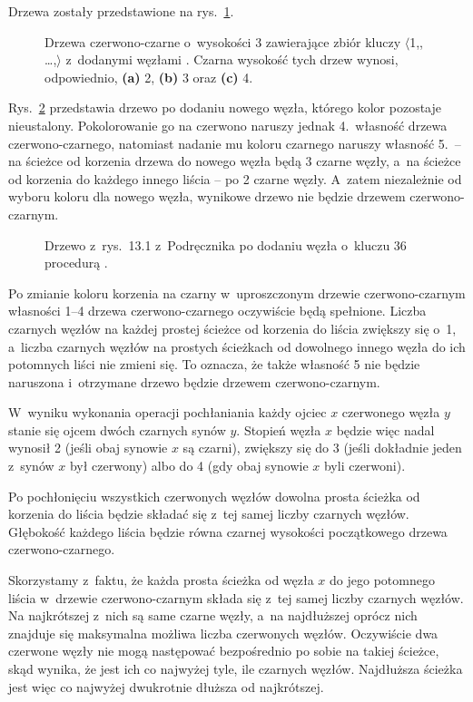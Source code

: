 
\exercise %
Drzewa zostały przedstawione na rys.\ \ref{fig:13.1-1}.
\begin{figure}[ht]
	\centering 
	\caption{Drzewa czerwono-czarne o~wysokości 3 zawierające zbiór kluczy $\langle$1,,\! \dots,$\rangle$ z~dodanymi węzłami .
	Czarna wysokość tych drzew wynosi, odpowiednio, {\sffamily\bfseries(a)} 2, {\sffamily\bfseries(b)} 3 oraz {\sffamily\bfseries(c)} 4.} \label{fig:13.1-1}
\end{figure}

\exercise %
Rys.\ \ref{fig:13.1-2} przedstawia drzewo po dodaniu nowego węzła, którego kolor pozostaje nieustalony.
Pokolorowanie go na czerwono naruszy jednak 4.\ własność drzewa czerwono-czarnego, natomiast nadanie mu koloru czarnego naruszy własność 5.\ -- na ścieżce od korzenia drzewa do nowego węzła będą 3 czarne węzły, a~na ścieżce od korzenia do każdego innego liścia -- po 2 czarne węzły.
A~zatem niezależnie od wyboru koloru dla nowego węzła, wynikowe drzewo nie będzie drzewem czerwono-czarnym.
\begin{figure}[ht]
	\centering 
	\caption{Drzewo z~rys.\ 13.1 z~Podręcznika po dodaniu węzła o~kluczu 36 procedurą .} \label{fig:13.1-2}
\end{figure}

\exercise %
Po zmianie koloru korzenia na czarny w~uproszczonym drzewie czerwono-czarnym własności 1--4 drzewa czerwono-czarnego oczywiście będą spełnione.
Liczba czarnych węzłów na każdej prostej ścieżce od korzenia do liścia zwiększy się o~1, a~liczba czarnych węzłów na prostych ścieżkach od dowolnego innego węzła do ich potomnych liści nie zmieni się.
To oznacza, że także własność 5 nie będzie naruszona i~otrzymane drzewo będzie drzewem czerwono-czarnym.

\exercise %
W~wyniku wykonania operacji pochłaniania każdy ojciec $x$ czerwonego węzła $y$ stanie się ojcem dwóch czarnych synów $y$.
Stopień węzła $x$ będzie więc nadal wynosił 2 (jeśli obaj synowie $x$ są czarni), zwiększy się do 3 (jeśli dokładnie jeden z~synów $x$ był czerwony) albo do 4 (gdy obaj synowie $x$ byli czerwoni).

Po pochłonięciu wszystkich czerwonych węzłów dowolna prosta ścieżka od korzenia do liścia będzie składać się z~tej samej liczby czarnych węzłów.
Głębokość każdego liścia będzie równa czarnej wysokości początkowego drzewa czerwono-czarnego.

\exercise %
Skorzystamy z~faktu, że każda prosta ścieżka od węzła $x$ do jego potomnego liścia w~drzewie czerwono-czarnym składa się z~tej samej liczby czarnych węzłów.
Na najkrótszej z~nich są same czarne węzły, a~na najdłuższej oprócz nich znajduje się maksymalna możliwa liczba czerwonych węzłów.
Oczywiście dwa czerwone węzły nie mogą następować bezpośrednio po sobie na takiej ścieżce, skąd wynika, że jest ich co najwyżej tyle, ile czarnych węzłów.
Najdłuższa ścieżka jest więc co najwyżej dwukrotnie dłuższa od najkrótszej.

\exercise %
\exercise %
